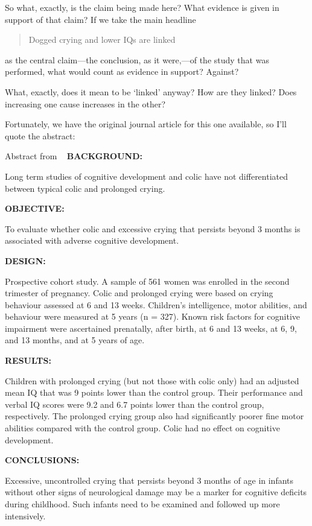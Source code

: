 \begin{refsection}
So what, exactly, is the claim being made here? What evidence is given in support of that claim? If we take the main headline

\begin{quote}

Dogged crying and lower IQs are linked
\end{quote}

as the central claim---the conclusion, as it were,---of the study that was performed, what would count as evidence in support? Against? 

What, exactly, does it mean to be `linked' anyway? How are they linked? Does increasing one cause increases in the other?

Fortunately, we have the original journal article for this one available, so I'll quote the abstract:
\begin{apatextbox}{Abstract from  ~\citep{Rao:2004ku} }
\textbf{BACKGROUND:}

Long term studies of cognitive development and colic have not differentiated between typical colic and prolonged crying.

\textbf{OBJECTIVE:}

To evaluate whether colic and excessive crying that persists beyond 3 months is associated with adverse cognitive development.

\textbf{DESIGN:}

Prospective cohort study. A sample of 561 women was enrolled in the second trimester of pregnancy. Colic and prolonged crying were based on crying behaviour assessed at 6 and 13 weeks. Children's intelligence, motor abilities, and behaviour were measured at 5 years (n = 327). Known risk factors for cognitive impairment were ascertained prenatally, after birth, at 6 and 13 weeks, at 6, 9, and 13 months, and at 5 years of age.

\textbf{RESULTS:}

Children with prolonged crying (but not those with colic only) had an adjusted mean IQ that was 9 points lower than the control group. Their performance and verbal IQ scores were 9.2 and 6.7 points lower than the control group, respectively. The prolonged crying group also had significantly poorer fine motor abilities compared with the control group. Colic had no effect on cognitive development.

\textbf{CONCLUSIONS:}

Excessive, uncontrolled crying that persists beyond 3 months of age in infants without other signs of neurological damage may be a marker for cognitive deficits during childhood. Such infants need to be examined and followed up more intensively.
\end{apatextbox}


\end{refsection}
